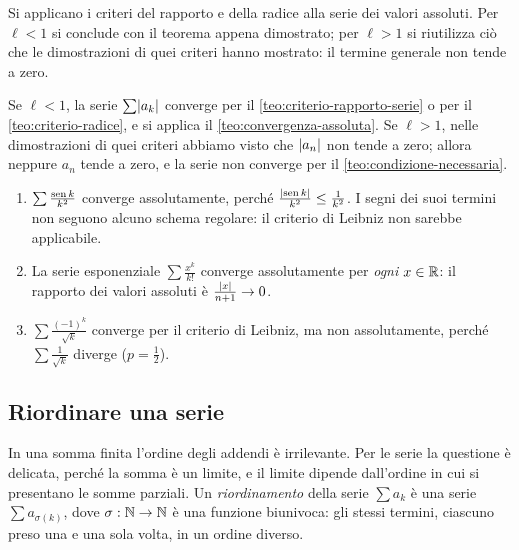 \begin{strategia}
Si applicano i criteri del rapporto e della radice alla serie dei valori assoluti. Per
$\ell<1$ si conclude con il teorema appena dimostrato; per $\ell>1$ si riutilizza ciò che le
dimostrazioni di quei criteri hanno mostrato: il termine generale non tende a zero.
\end{strategia}

\begin{dimostrazione}
Se $\ell<1$, la serie $\sum\lvert a_{k}\rvert$ converge per il \cref{teo:criterio-rapporto-serie} o per il
\cref{teo:criterio-radice}, e si applica il \cref{teo:convergenza-assoluta}. Se $\ell>1$, nelle
dimostrazioni di quei criteri abbiamo visto che $\lvert a_{n}\rvert$ non tende a zero; allora neppure
$a_{n}$ tende a zero, e la serie non converge per il \cref{teo:condizione-necessaria}.
\end{dimostrazione}

\begin{esempio}\label{es:assoluta}
\begin{enumerate}[label=(\alph*)]
  \item $\sum\frac{\operatorname{sen} k}{k^{2}}$ converge assolutamente, perché $\frac{\lvert \operatorname{sen} k\rvert}{k^{2}}\le\frac1{k^{2}}$. I segni dei
  suoi termini non seguono alcuno schema regolare: il criterio di Leibniz non sarebbe
  applicabile.
  \item La serie esponenziale $\sum\frac{x^{k}}{k!}$ converge assolutamente per \emph{ogni}
  $x\in\mathbb{R}$: il rapporto dei valori assoluti è $\frac{\lvert x\rvert}{n+1}\to0$.
  \item $\sum\frac{(-1)^{k}}{\sqrt k}$ converge per il criterio di Leibniz, ma non assolutamente,
  perché $\sum\frac1{\sqrt k}$ diverge ($p=\frac12$).
\end{enumerate}
\end{esempio}

\subsection{Riordinare una serie}

In una somma finita l'ordine degli addendi è irrilevante. Per le serie la questione è
delicata, perché la somma è un limite, e il limite dipende dall'ordine in cui si
presentano le somme parziali. Un \emph{riordinamento} della serie $\sum a_{k}$ è una serie
$\sum a_{\sigma(k)}$, dove $\sigma:\mathbb{N}\to\mathbb{N}$ è una funzione biunivoca: gli stessi termini, ciascuno
preso una e una sola volta, in un ordine diverso.

